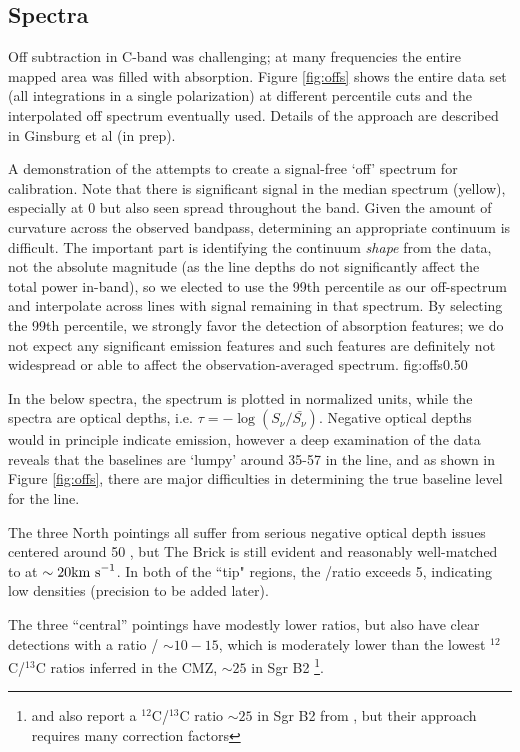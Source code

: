 \subsection{Spectra}
\label{sec:Spectra}

Off subtraction in C-band was challenging; at many frequencies the entire
mapped area was filled with \formaldehyde \oneone absorption.  Figure
\ref{fig:offs} shows the entire data set (all integrations in a single
polarization) at different percentile cuts and the interpolated off spectrum
eventually used.  Details of the approach are described in Ginsburg et al (in prep).


{A demonstration of the attempts to create a signal-free `off' spectrum for
calibration.  Note that there is significant signal in the median spectrum
(yellow), especially at 0 \kms but also seen spread throughout the band.  Given
the amount of curvature across the observed bandpass, determining an
appropriate continuum is difficult.  The important part is identifying the
continuum \emph{shape} from the data, not the absolute magnitude (as the line
depths do not significantly affect the total power in-band), so we elected to
use the 99th percentile as our off-spectrum and interpolate across lines with
signal remaining in that spectrum.  By selecting the 99th percentile, we
strongly favor the detection of absorption features; we do not expect any
significant emission features and such features are definitely not widespread
or able to affect the observation-averaged spectrum.}
{fig:offs}{0.5}{0}

In the below spectra, the \ammonia spectrum is plotted in normalized units,
while the \formaldehyde spectra are optical depths, i.e.
$\tau=-\log(S_\nu/\bar{S_\nu})$.  Negative optical depths would in principle
indicate emission, however a deep examination of the data reveals that the
baselines are `lumpy' around 35-57 \kms in the \twotwo line, and as shown in
Figure \ref{fig:offs}, there are major difficulties in determining the true
baseline level for the \oneone line.

The three North pointings all suffer from serious negative optical depth issues centered
around 50 \kms, but The Brick is still evident and reasonably well-matched to \ammonia
at $\sim20 \textrm{km~s}^{-1}$.  In both of the ``tip" regions, the \oneone/\twotwo ratio exceeds 5, indicating
low densities (precision to be added later).

The three ``central'' pointings have modestly lower ratios, but also have clear
\formaldehydeIso detections with a ratio \formaldehyde/\formaldehydeIso
$\sim10-15$, which is moderately lower than the lowest $^{12}$C/$^{13}$C ratios
inferred in the CMZ, $\sim25$ in Sgr B2
\citep{Langer1990a,Savage1992a}\footnote{\citet{Henkel1982a} and
\citet{Henkel1983a} also report a $^{12}$C/$^{13}$C ratio $\sim25$ in Sgr B2
from \formaldehyde, but their approach requires many correction factors}.  

